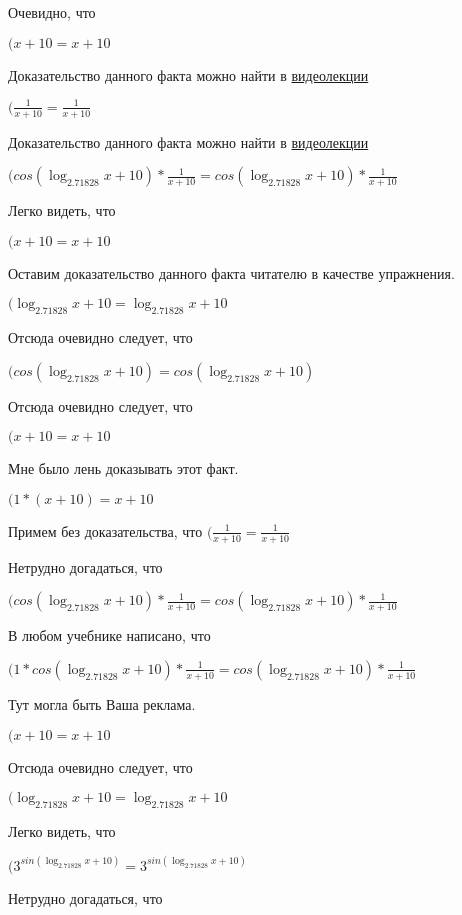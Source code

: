 \documentclass[12pt,a4paper,fleqn]{article}
\theoremstyle{definition}
\begin{document}
Очевидно, что

$( x  +  10  =  x  +  10 $

Доказательство данного факта можно найти в \href{https://www.youtube.com/watch?v=dQw4w9WgXcQ}{видеолекции}

$(\frac{ 1 }{ x  +  10 }
 = \frac{ 1 }{ x  +  10 }
$

Доказательство данного факта можно найти в \href{https://www.youtube.com/watch?v=dQw4w9WgXcQ}{видеолекции}

$(cos(\log_{ 2.71828 }{ x  +  10 }) * \frac{ 1 }{ x  +  10 }
 = cos(\log_{ 2.71828 }{ x  +  10 }) * \frac{ 1 }{ x  +  10 }
$

Легко видеть, что

$( x  +  10  =  x  +  10 $

Оставим доказательство данного факта читателю в качестве упражнения.

$(\log_{ 2.71828 }{ x  +  10 } = \log_{ 2.71828 }{ x  +  10 }$

Отсюда очевидно следует, что

$(cos(\log_{ 2.71828 }{ x  +  10 }) = cos(\log_{ 2.71828 }{ x  +  10 })$

Отсюда очевидно следует, что

$( x  +  10  =  x  +  10 $

Мне было лень доказывать этот факт.

$( 1  * ( x  +  10 ) =  x  +  10 $

Примем без доказательства, что
$(\frac{ 1 }{ x  +  10 }
 = \frac{ 1 }{ x  +  10 }
$

Нетрудно догадаться, что

$(cos(\log_{ 2.71828 }{ x  +  10 }) * \frac{ 1 }{ x  +  10 }
 = cos(\log_{ 2.71828 }{ x  +  10 }) * \frac{ 1 }{ x  +  10 }
$

В любом учебнике написано, что

$( 1  * cos(\log_{ 2.71828 }{ x  +  10 }) * \frac{ 1 }{ x  +  10 }
 = cos(\log_{ 2.71828 }{ x  +  10 }) * \frac{ 1 }{ x  +  10 }
$

Тут могла быть Ваша реклама.

$( x  +  10  =  x  +  10 $

Отсюда очевидно следует, что

$(\log_{ 2.71828 }{ x  +  10 } = \log_{ 2.71828 }{ x  +  10 }$

Легко видеть, что

$({ 3 }^{sin(\log_{ 2.71828 }{ x  +  10 })} = { 3 }^{sin(\log_{ 2.71828 }{ x  +  10 })}$

Нетрудно догадаться, что
\end{document}
